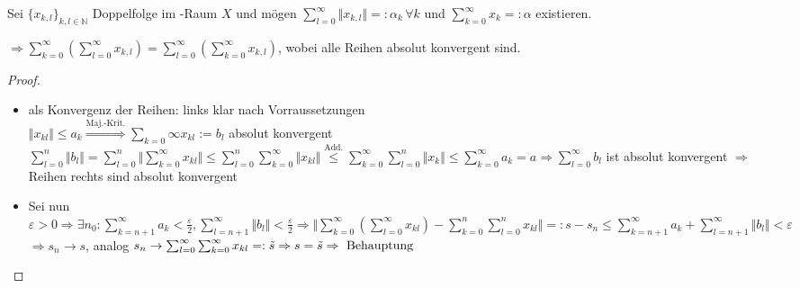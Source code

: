 \begin{proposition}[Doppelreihenproposition]
	Sei $\{x_{k,l}\}_{k,l\in\mathbb{N}}$ Doppelfolge im -Raum $X$ und mögen $\sum_{l=0}^\infty \Vert x_{k,l}\Vert =:\alpha_k\,\forall k$ und $\sum_{k=0}^\infty x_k =: \alpha$ existieren.
	
	$\Rightarrow \sum_{k=0}^\infty \left(\sum_{l=0}^\infty x_{k,l}\right) = \sum_{l=0}^{\infty}\left( \sum_{k=0}^\infty x_{k,l}\right)$, wobei alle Reihen absolut konvergent sind.
\end{proposition}
\begin{proof}
	\begin{itemize}
		\item als Konvergenz der Reihen: links klar nach Vorraussetzungen \\
		$\Vert x_{kl}\Vert\le a_k\overset{\text{Maj.-Krit.}}{\Rightarrow}\sum_{k=0}^{}\infty x_{kl}:=b_l$ absolut konvergent $\sum_{l=0}^{n}\Vert b_l\Vert=\sum_{l=0}^{n}\Vert\sum_{k=0}^{\infty} x_{kl}\Vert\le \sum_{l=0}^n\sum_{k=0}^{\infty}\Vert x_{kl}\Vert\overset{\text{Add.}}{\le} \sum_{k=0}^{\infty}\sum_{l=0}^n \Vert x_k\Vert\le \sum_{k=0}^{\infty} a_k=a \Rightarrow\sum_{l=0}^{\infty} b_l$ ist absolut konvergent $\Rightarrow$ Reihen rechts sind absolut konvergent
		\item Sei nun $\varepsilon>0\Rightarrow\exists n_0:\sum_{k=n+1}^{\infty} a_k<\frac{\varepsilon}{2}, \sum_{l=n+1}^{\infty} \Vert b_l\Vert <\frac{\varepsilon}{2}\Rightarrow\Vert\sum_{k=0}^{\infty} \left( \sum_{l=0}^{\infty} x_{kl}\right) - \sum_{k=0}^n \sum_{l=0}^{n} x_{kl}\Vert =: s-s_n\le \sum_{k=n+1}^{\infty} a_k+\sum_{l=n+1}^{\infty} \Vert b_l\Vert <\varepsilon$ \\
		$\Rightarrow s_n\to s$, analog $s_n\to\sum_{l=0}^{\infty} \sum_{k=0}^{\infty} x_{kl}=:\tilde{s}\Rightarrow s=\tilde{s}\Rightarrow \text{ Behauptung}$
	\end{itemize}
\end{proof}